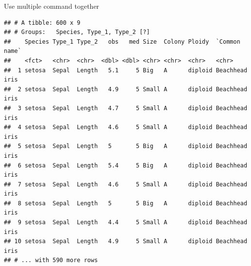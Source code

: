 \documentclass[14pt,ignorenonframetext,]{bredelebeamer}
\newenvironment{Shaded}{\begin{snugshade}}{\end{snugshade}}
\newcommand{\KeywordTok}[1]{\textcolor[rgb]{0.94,0.87,0.69}{#1}}
\newcommand{\DataTypeTok}[1]{\textcolor[rgb]{0.87,0.87,0.75}{#1}}
\newcommand{\DecValTok}[1]{\textcolor[rgb]{0.86,0.86,0.80}{#1}}
\newcommand{\CharTok}[1]{\textcolor[rgb]{0.86,0.64,0.64}{#1}}
\newcommand{\StringTok}[1]{\textcolor[rgb]{0.80,0.58,0.58}{#1}}
\newcommand{\OperatorTok}[1]{\textcolor[rgb]{0.94,0.94,0.82}{#1}}
\newcommand{\NormalTok}[1]{\textcolor[rgb]{0.80,0.80,0.80}{#1}}
\begin{document}
\begin{frame}[fragile]{Use multiple command together}

\small

\begin{Shaded}
\end{Shaded}

\begin{verbatim}
## # A tibble: 600 x 9
## # Groups:   Species, Type_1, Type_2 [?]
##    Species Type_1 Type_2   obs   med Size  Colony Ploidy  `Common name` 
##    <fct>   <chr>  <chr>  <dbl> <dbl> <chr> <chr>  <chr>   <chr>         
##  1 setosa  Sepal  Length   5.1     5 Big   A      diploid Beachhead iris
##  2 setosa  Sepal  Length   4.9     5 Small A      diploid Beachhead iris
##  3 setosa  Sepal  Length   4.7     5 Small A      diploid Beachhead iris
##  4 setosa  Sepal  Length   4.6     5 Small A      diploid Beachhead iris
##  5 setosa  Sepal  Length   5       5 Big   A      diploid Beachhead iris
##  6 setosa  Sepal  Length   5.4     5 Big   A      diploid Beachhead iris
##  7 setosa  Sepal  Length   4.6     5 Small A      diploid Beachhead iris
##  8 setosa  Sepal  Length   5       5 Big   A      diploid Beachhead iris
##  9 setosa  Sepal  Length   4.4     5 Small A      diploid Beachhead iris
## 10 setosa  Sepal  Length   4.9     5 Small A      diploid Beachhead iris
## # ... with 590 more rows
\end{verbatim}

\end{frame}
\end{document}

